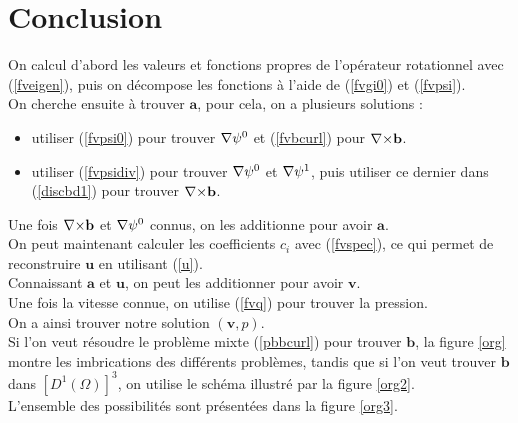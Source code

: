 \section{Conclusion}

On calcul d'abord les valeurs et fonctions propres de l'opérateur rotationnel avec (\ref{fveigen}), puis on décompose les fonctions à l'aide de (\ref{fvgi0}) et (\ref{fvpsi}).\\
On cherche ensuite à trouver $\mathbf{a}$, pour cela, on a plusieurs solutions :
\begin{itemize}
\item utiliser (\ref{fvpsi0}) pour trouver ${\nabla}\psi^0$  et (\ref{fvbcurl}) pour ${\nabla\times} \mathbf{b}$.
\item utiliser (\ref{fvpsidiv}) pour trouver ${\nabla}\psi^0$ et ${\nabla}\psi^1$, puis utiliser ce dernier dans (\ref{discbd1}) pour trouver ${\nabla\times} \mathbf{b}$.
\end{itemize}
Une fois ${\nabla\times} \mathbf{b}$ et ${\nabla}\psi^0$ connus, on les additionne pour avoir $\mathbf{a}$.\\
On peut maintenant calculer les coefficients $c_i$ avec (\ref{fvspec}), ce qui permet de reconstruire $\mathbf{u}$ en utilisant (\ref{u}).\\
Connaissant $\mathbf{a}$ et $\mathbf{u}$, on peut les additionner pour avoir $\mathbf{v}$.\\
Une fois la vitesse connue, on utilise (\ref{fvq}) pour trouver la pression.\\

On a ainsi trouver notre solution $(\mathbf{v},p)$.\\
Si l'on veut résoudre le problème mixte (\ref{pbbcurl}) pour trouver $\mathbf{b}$, la figure \ref{org} montre les imbrications des différents problèmes, tandis que si l'on veut trouver $\mathbf{b}$ dans $[D^1(\Omega)]^3$, on utilise le schéma illustré par la figure \ref{org2}.\\
L'ensemble des possibilités sont présentées dans la figure \ref{org3}.\\

